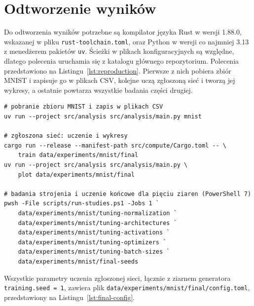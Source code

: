 \section{Odtworzenie wyników}
\label{app:reproduction}

Do odtworzenia wyników potrzebne są kompilator języka Rust w wersji 1.88.0, wskazanej w pliku \texttt{rust-toolchain.toml}, oraz Python w wersji co najmniej 3.13 z menedżerem pakietów \texttt{uv}. Ścieżki w plikach konfiguracyjnych są względne, dlatego polecenia uruchamia się z katalogu głównego repozytorium. Polecenia przedstawiono na Listingu~\ref{lst:reproduction}. Pierwsze z nich pobiera zbiór MNIST i zapisuje go w plikach CSV, kolejne uczą zgłoszoną sieć i tworzą jej wykresy, a ostatnie powtarza wszystkie badania części drugiej.

\begin{code}
\begin{Verbatim}[fontsize=\small]
# pobranie zbioru MNIST i zapis w plikach CSV
uv run --project src/analysis src/analysis/main.py mnist

# zgłoszona sieć: uczenie i wykresy
cargo run --release --manifest-path src/compute/Cargo.toml -- \
    train data/experiments/mnist/final
uv run --project src/analysis src/analysis/main.py \
    plot data/experiments/mnist/final

# badania strojenia i uczenie końcowe dla pięciu ziaren (PowerShell 7)
pwsh -File scripts/run-studies.ps1 -Jobs 1 `
    data/experiments/mnist/tuning-normalization `
    data/experiments/mnist/tuning-architectures `
    data/experiments/mnist/tuning-activations `
    data/experiments/mnist/tuning-optimizers `
    data/experiments/mnist/tuning-batch-sizes `
    data/experiments/mnist/final-seeds
\end{Verbatim}
    \caption{Polecenia odtwarzające wyniki części drugiej, uruchamiane z katalogu głównego repozytorium.}
    \label{lst:reproduction}
\end{code}

\noindent
Wszystkie parametry uczenia zgłoszonej sieci, łącznie z ziarnem generatora \mbox{\texttt{training.seed = 1}}, zawiera plik \texttt{data/experiments/mnist/final/config.toml}, przedstawiony na Listingu~\ref{lst:final-config}.

\begin{code}
    
    \caption{Plik \texttt{config.toml} zgłoszonej sieci.}
    \label{lst:final-config}
\end{code}

